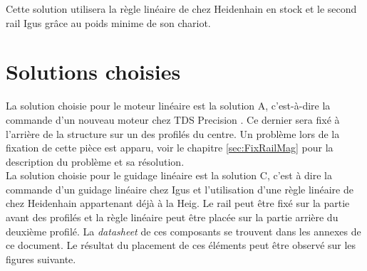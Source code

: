 \begin{table}[H]
  \centering
  \caption{Offres pour le guidage}
  \label{tab:OffreGuid2}
\end{table}

Cette solution utilisera la règle linéaire de chez Heidenhain \cite{Heidenhain} en stock et le second rail Igus \cite{Igus} grâce au poids minime de son chariot.

\section{Solutions choisies}\label{sec:SolChoix}

La solution choisie pour le moteur linéaire est la solution A, c'est-à-dire la commande d'un nouveau moteur chez TDS Precision \cite{TDSPrecisionProducts}. Ce dernier
sera fixé à l'arrière de la structure sur un des profilés du centre. Un problème lors de la fixation de cette pièce est apparu, voir le chapitre
\ref{sec:FixRailMag} pour la description du problème et sa résolution.\\

La solution choisie pour le guidage linéaire est la solution C, c'est à dire la commande d'un guidage linéaire chez Igus \cite{Igus} et l'utilisation d'une
règle linéaire de chez Heidenhain \cite{Heidenhain} appartenant déjà à la \acrshort{Heig}. Le rail peut être fixé sur la partie avant des profilés et la règle linéaire peut
être placée sur la partie arrière du deuxième profilé. La \textit{datasheet} de ces composants se trouvent dans les annexes de ce document. Le résultat du placement de ces
éléments peut être observé sur les figures suivante.

